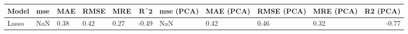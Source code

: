 \begin{table}
\centering
\label{table:iri_reg_pred}
\begin{tabular}{lllllrllllr}
\toprule
\textbf{Model} & \textbf{mse} & \textbf{MAE} & \textbf{RMSE} & \textbf{MRE} & $\textbf{R^2}$ & \textbf{mse (PCA)} & \textbf{MAE (PCA)} & \textbf{RMSE (PCA)} & \textbf{MRE (PCA)} & \textbf{R2 (PCA)} \\
\midrule
         Lasso &          NaN &         0.38 &          0.42 &         0.27 &          -0.49 &                NaN &               0.42 &                0.46 &               0.32 &             -0.77 \\
\bottomrule
\end{tabular}
\end{table}
